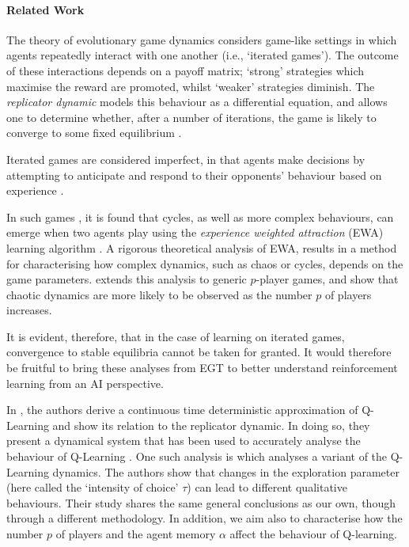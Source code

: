\documentclass{article}
\begin{document}
\paragraph{Related Work}
The theory of evolutionary game dynamics \cite{von-Neumann:games}
considers game-like settings in which agents repeatedly interact
with one another (i.e., `iterated games'). The outcome of these interactions depends on a payoff
matrix; `strong' strategies which maximise the reward are promoted,
whilst `weaker' strategies diminish. The \textit{replicator dynamic}
models this behaviour as a differential equation, and allows one to determine whether, after a
number of iterations, the game is likely to converge to some fixed
equilibrium \cite{shoham_leyton-brown_2008}.

Iterated games are considered imperfect, in that agents make decisions by attempting to anticipate and respond to their opponents' behaviour
based on experience \cite{galla:cycles}. 

In such games \cite{galla:complex}, it is found that cycles, as well as more complex behaviours, can emerge when two agents play using the \textit{experience weighted attraction} (EWA) learning algorithm \cite{hocamerer:ewa}. A rigorous theoretical analysis of EWA, results in a method for characterising how complex dynamics, such as chaos or cycles, depends on the game parameters. \cite{sanders:prevalence} extends this analysis to generic $p$-player games, and show that chaotic
dynamics are more likely to be observed as the number $p$ of players
increases.

It is evident, therefore, that in the case of learning on iterated
games, convergence to stable equilibria cannot be taken for granted. It would therefore be fruitful to bring these
analyses from EGT to better understand reinforcement learning from an
AI perspective.

In \cite{tuyls:iteratedgames}, the authors derive a continuous time deterministic approximation of  Q-Learning
and show its relation to the replicator
dynamic. In doing so, they present a dynamical system that
has been used to accurately analyse the behaviour of Q-Learning \cite{bloembergen:survey}. One such analysis is \cite{piliouras:catastrophe} which analyses a variant of the Q-Learning dynamics. The authors show that changes in the exploration parameter (here called the `intensity of choice' $\tau$) can lead to different qualitative behaviours. Their study shares the same general conclusions as our own, though through a different methodology. In addition, we aim also to characterise how the number $p$ of players  and the agent memory $\alpha$ affect the behaviour of Q-learning.
\end{document}
